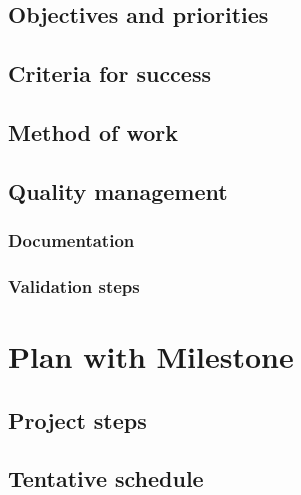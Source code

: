 \documentclass{seal_article}
\begin{document}
\subsection{Objectives and priorities}
\subsection{Criteria for success}
\subsection{Method of work}
\subsection{Quality management}
\subsubsection{Documentation}
\subsubsection{Validation steps}

\section{Plan with Milestone}
\subsection{Project steps}
\subsection{Tentative schedule}




\end{document}
